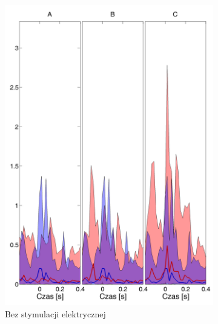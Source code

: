 \documentclass{pracamgr}
\begin{document}
	\begin{figure}[h]
		\begin{subfigure}{.5\textwidth}
			\centering
			\includegraphics[width=1.\linewidth]{kontrola15_20-40_z_CxC8_do_LGN82.png}
			\caption{Bez stymulacji elektrycznej}
			\label{rys:20_40_kon_CxC_LGN}
		\end{subfigure}%
		\begin{subfigure}{.5\textwidth}
			\centering

\end{subfigure}
\end{figure}
\end{document}
